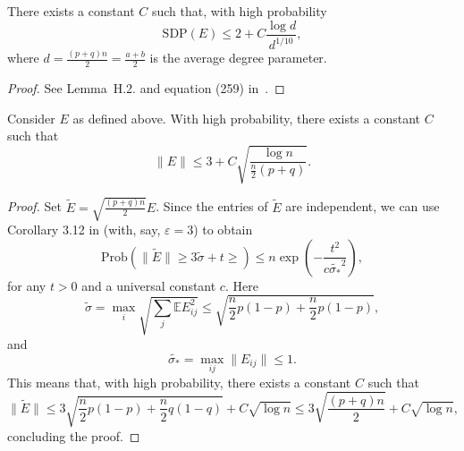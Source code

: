 \documentclass{colt2016} %
\newcommand{\1}{\mathbf{1}}
\newcommand{\EE}{\mathbb{E}}
\newcommand{\eps}{\varepsilon}
\begin{document}
\begin{lemma}\label{lemma:sbm:SDPE}
There exists a constant $C$ such that, with high probability
\[
\mathrm{SDP}(E) \leq 2 + C\frac{\log d}{d^{1/10}},
\]
where $d = \frac{(p+q)n}{2} = \frac{a+b}2$ is the average degree parameter.
\end{lemma}

\begin{proof}
See Lemma~H.2. and equation (259) in~\citep{Montanari_SDPdetectionSBM}. 
\end{proof}

\begin{lemma}\label{lemma:sbm:spectralnormE}
Consider $E$ as defined above. With high probability, there exists a constant $C$ such that
\[
 \|E\| \leq 3 + C\sqrt{\frac{\log n}{\frac{n}2(p+q)}}.
\]
\end{lemma}
\begin{proof}
Set $\tilde{E} = \sqrt{\frac{(p+q)n}{2}}E$. Since the entries of $\tilde{E}$ are independent, we can use Corollary 3.12 in \citep{Bandeira_NARandomMatrixBound} (with, say, $\eps=3$) to obtain
\[
\mathrm{Prob}\left( \|\tilde{E}\| \geq 3\tilde{\sigma} + t \geq  \right) \leq n\exp\left(-\frac{t^2}{c\tilde{\sigma_\ast}^2}\right),
\]
for any $t>0$ and a universal constant $c$. Here
\[
\tilde{\sigma}  = \max_{i}\sqrt{\sum_j\EE E_{ij}^2} \leq \sqrt{\frac{n}2p(1-p) + \frac{n}2p(1-p)}, 
\]
and
\[
\tilde{\sigma_\ast} = \max_{ij}\|E_{ij}\| \leq 1.
\]
This means that, with high probability, there exists a constant $C$ such that
\[
 \|\tilde{E}\| \leq 3\sqrt{\frac{n}2p(1-p) + \frac{n}2q(1-q)} + C\sqrt{\log n} \leq 3\sqrt{\frac{(p+q)n}2} + C\sqrt{\log n},
\]
concluding the proof.
\end{proof}
\end{document}
